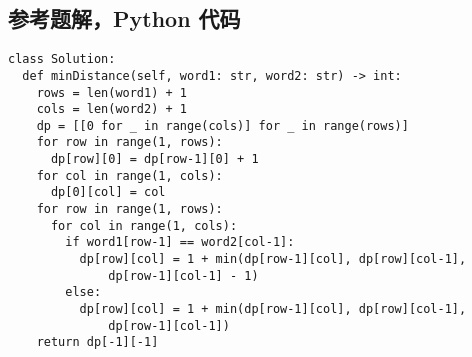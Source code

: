 \subsection{参考题解，Python 代码}

\begin{verbatim}
class Solution:
  def minDistance(self, word1: str, word2: str) -> int:
    rows = len(word1) + 1
    cols = len(word2) + 1
    dp = [[0 for _ in range(cols)] for _ in range(rows)]
    for row in range(1, rows):
      dp[row][0] = dp[row-1][0] + 1
    for col in range(1, cols):
      dp[0][col] = col
    for row in range(1, rows):
      for col in range(1, cols):
        if word1[row-1] == word2[col-1]:
          dp[row][col] = 1 + min(dp[row-1][col], dp[row][col-1],
              dp[row-1][col-1] - 1)
        else:
          dp[row][col] = 1 + min(dp[row-1][col], dp[row][col-1],
              dp[row-1][col-1])
    return dp[-1][-1]
\end{verbatim}
